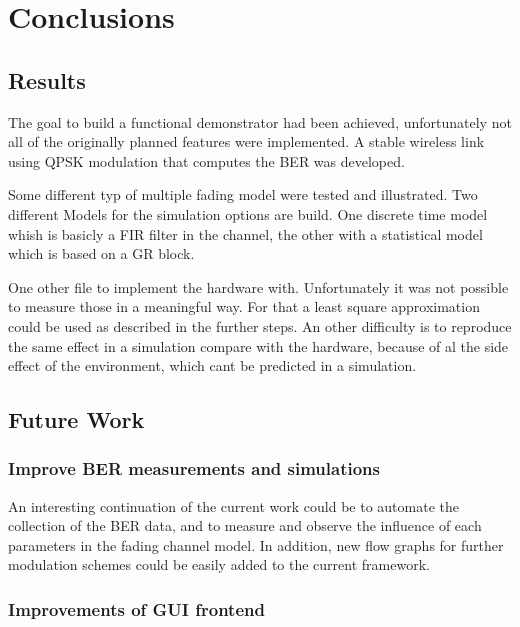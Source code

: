 
\chapter{Conclusions} \label{chp:conclusions}

\section{Results}

The goal to build a functional demonstrator had been achieved, unfortunately not all of the originally planned features were implemented. A stable wireless link using QPSK modulation that computes the BER was developed.

Some different typ of multiple fading model were tested and illustrated.
Two different Models for the simulation options are build. One discrete time model whish is  basicly a FIR filter in the channel, the other with a statistical model which is based on a GR block.

One other file to implement the hardware with. Unfortunately it was not possible to measure those in a meaningful way. For that a least square approximation could be used as described in the further steps. An other difficulty is to reproduce the same effect in a simulation compare with the hardware, because of al the side effect of the environment, which cant be predicted in a simulation.


\section{Future Work}

\subsection{Improve BER measurements and simulations}

An interesting continuation of the current work could be to automate the collection of the BER data, and to measure and observe the influence of each parameters in the fading channel model. In addition, new flow graphs for further modulation schemes could be easily added to the current framework.

\subsection{Improvements of GUI frontend}

